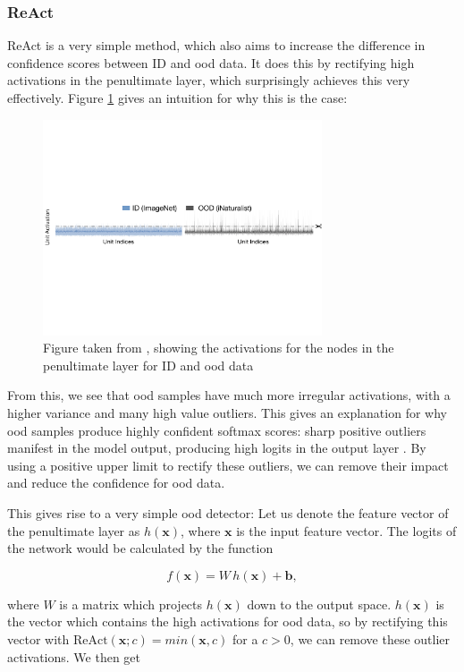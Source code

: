 \documentclass[UKenglish]{uiomasterthesis} %
\theoremstyle{definition}
\begin{document}
\subsubsection{ReAct}

ReAct \cite{react} is a very simple method, which also aims to increase the difference in confidence scores between ID and \ac{ood} data. It does this by rectifying high activations in the penultimate layer, which surprisingly achieves this very effectively. Figure \ref{react} gives an intuition for why this is the case:

\begin{figure}[h]
\centerline{\includegraphics[width=3.25in]{figure/react.pdf}}
\caption{Figure taken from \cite{react}, showing the activations for the nodes in the penultimate layer for ID and \ac{ood} data}
\label{react}
\end{figure}

From this, we see that \ac{ood} samples have much more irregular activations, with a higher variance and many high value outliers. This gives an explanation for why \ac{ood} samples produce highly confident softmax scores: sharp positive outliers manifest in the model output, producing high logits in the output layer \cite{react}. By using a positive upper limit to rectify these outliers, we can remove their impact and reduce the confidence for \ac{ood} data.

This gives rise to a very simple \ac{ood} detector: Let us denote the feature vector of the penultimate layer as $h(\bm{x})$, where $\bm{x}$ is the input feature vector. The logits of the network would be calculated by the function

\begin{equation}\label{dog}
  f(\bm{x}) = W \, h(\bm{x}) + \bm{b},
\end{equation}

where $W$ is a matrix which projects $h(\bm{x})$ down to the output space. $h(\bm{x})$ is the vector which contains the high activations for \ac{ood} data, so by rectifying this vector with $\text{ReAct}(\bm{x}; c) = min(\bm{x}, c)$ for a $c > 0$, we can remove these outlier activations. We then get
\end{document}
